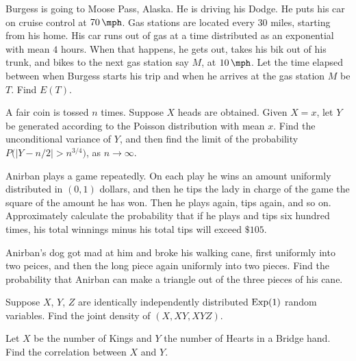\begin{problem}
  Burgess is going to Moose Pass, Alaska. He is driving his Dodge. He puts
  his car on cruise control at \(\SI{70}{\mph}\). Gas stations are located
  every \(30\) miles, starting from his home. His car runs out of gas at a
  time distributed as an exponential with mean \(4\) hours. When that
  happens, he gets out, takes his bik out of his trunk, and bikes to the
  next gas station say \(M\), at \(\SI{10}{\mph}\). Let the time elapsed
  between when Burgess starts his trip and when he arrives at the gas
  station \(M\) be \(T\). Find \(E(T)\).
\end{problem}
\begin{solution}
\end{solution}

\begin{problem}
  A fair coin is tossed \(n\) times. Suppose \(X\) heads are
  obtained. Given \(X=x\), let \(Y\) be generated according to the Poisson
  distribution with mean \(x\). Find the unconditional variance of \(Y\),
  and then find the limit of the probability
  \(P\bigl(|Y-n/2|>n^{3/4}\bigr)\), as \(n\to\infty\).
\end{problem}
\begin{solution}
\end{solution}

\begin{problem}
  Anirban plays a game repeatedly. On each play he wins an amount uniformly
  distributed in \((0,1)\) dollars, and then he tips the lady in charge of the
  game the square of the amount he has won. Then he plays again, tips
  again, and so on. Approximately calculate the probability that if he
  plays and tips six hundred times, his total winnings minus his total tips
  will exceed \(\$105\).
\end{problem}
\begin{solution}
\end{solution}

\begin{problem}
  Anirban's dog got mad at him and broke his walking cane, first uniformly
  into two peices, and then the long piece again uniformly into two
  pieces. Find the probability that Anirban can make a triangle out of the
  three pieces of his cane.
\end{problem}
\begin{solution}
\end{solution}

\begin{problem}
  Suppose \(X\), \(Y\), \(Z\) are identically independently distributed
  \(\operatorname{Exp}(1)\) random variables. Find the joint density of \((X,XY,XYZ)\).
\end{problem}
\begin{solution}
\end{solution}

\begin{problem}
  Let \(X\) be the number of Kings and \(Y\) the number of Hearts in a
  Bridge hand. Find the correlation between \(X\) and \(Y\).
\end{problem}
\begin{solution}
\end{solution}

